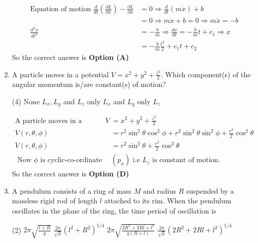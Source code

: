 \begin{enumerate}
\begin{tasks}
\end{tasks}
\begin{answer}
\begin{align*}
\text{Equation of motion }\frac{d}{d t}\left(\frac{\partial L}{\partial \dot{x}}\right)-\frac{\partial L}{\partial x}&=0 \Rightarrow \frac{d}{d t}(m \dot{x})+b\\&=0 \Rightarrow m \ddot{x}+b=0 \Rightarrow m \ddot{x}=-b\\
\frac{d^{2} x}{d t^{2}}&=-\frac{b}{m} \Rightarrow \frac{d x}{d t}=-\frac{b}{m} t+c_{1} \Rightarrow x\\&=-\frac{b}{m} \frac{t^{2}}{2}+c_{1} t+c_{2}
\end{align*}
So the correct answer is \textbf{Option (A)}
\end{answer}	
\item A particle moves in a potential $V=x^{2}+y^{2}+\frac{z^{2}}{2} .$ Which component(s) of the angular momentum is/are constant(s) of motion?
{}
\begin{tasks}(4)
\task[\textbf{A.}] None
\task[\textbf{B.}] $L_{x}, L_{y}$ and $L_{z}$
\task[\textbf{C.}]  only $L_{x}$ and $L_{y}$
\task[\textbf{D.}] only $L_{z}$
\end{tasks}
\begin{answer}
\begin{align*}
\text{A particle moves in a potential }V&=x^{2}+y^{2}+\frac{z^{2}}{2}\\
V(r, \theta, \phi)&=r^{2} \sin ^{2} \theta \cos ^{2} \phi+r^{2} \sin ^{2} \theta \sin ^{2} \phi+\frac{r^{2}}{2} \cos ^{2} \theta\\
V(r, \theta, \phi)&=r^{2} \sin ^{2} \theta+\frac{r^{2}}{2} \cos ^{2} \theta\\
\text{	Now $\phi$ is cyclic-co-ordinate }&\left(p_{\phi}\right)\text{ i.e $L_{z}$ is constant of motion.}
\end{align*}
So the correct answer is \textbf{Option (D)}
\end{answer}
\item A pendulum consists of a ring of mass $M$ and radius $R$ suspended by a massless rigid rod of length $l$ attached to its rim. When the pendulum oscillates in the plane of the ring, the time period of oscillation is
{}
\begin{tasks}(2)
\task[\textbf{A.}] $2 \pi \sqrt{\frac{l+R}{g}}$
\task[\textbf{B.}] $\frac{2 \pi}{\sqrt{g}}\left(l^{2}+R^{2}\right)^{1 / 4}$
\task[\textbf{C.}] $2 \pi \sqrt{\frac{2 R^{2}+2 R l+l^{2}}{g(R+l)}}$
\task[\textbf{D.}] $\frac{2 \pi}{\sqrt{g}}\left(2 R^{2}+2 R l+l^{2}\right)^{1 / 4}$

\end{tasks}
\end{enumerate}
